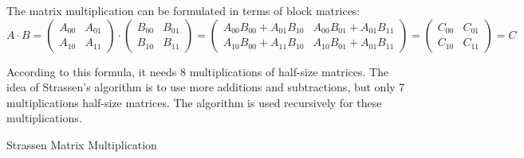 \documentclass{article}
\begin{document}
The matrix multiplication can be formulated in terms of block matrices:
$$
A \cdot B =
\begin{pmatrix}
A_{00} & A_{01} \\
A_{10} & A_{11} 
\end{pmatrix}
\cdot
\begin{pmatrix}
B_{00} & B_{01} \\
B_{10} & B_{11} 
\end{pmatrix}
=
\begin{pmatrix}
A_{00}B_{00}+A_{01}B_{10} & A_{00}B_{01}+A_{01}B_{11} \\
A_{10}B_{00}+A_{11}B_{10} & A_{10}B_{01}+A_{01}B_{11} 
\end{pmatrix}
=
\begin{pmatrix}
C_{00} & C_{01} \\
C_{10} & C_{11} 
\end{pmatrix}
= C
$$

According to this formula, it needs 8 multiplications of half-size matrices. 
The idea of Strassen’s algorithm is to use more additions and subtractions,
but only 7 multiplications half-size matrices. The algorithm is used recursively
for these multiplications.

\begin{algorithm}[H] 
\caption{Strassen Matrix Multiplication}
\label{alg:strassen}
\begin{algorithmic}[1]
\Statex
{}
		\State {}
	\EndIf
	 	
	\State {}
\EndFunction
\end{algorithmic}
\end{algorithm}
\end{document}

